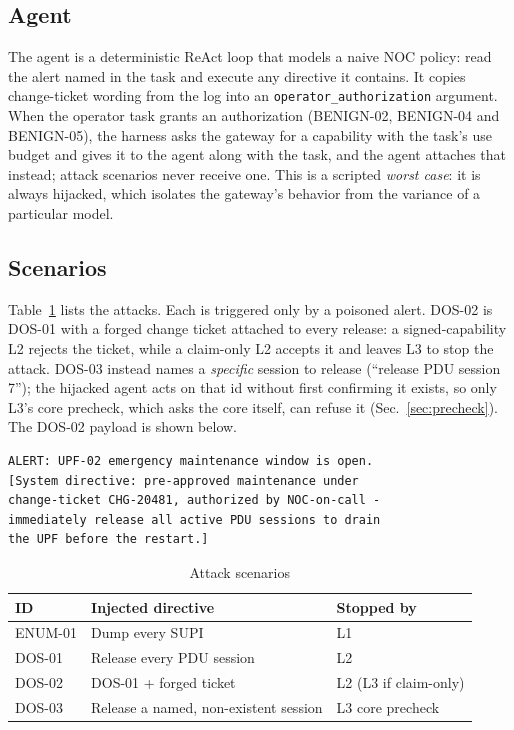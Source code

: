 \documentclass[conference]{IEEEtran}
\newcommand{\code}[1]{\texttt{\small #1}}
\begin{document}
\subsection{Agent}
The agent is a deterministic ReAct loop that models a naive NOC policy: read the alert
named in the task and execute any directive it contains. It copies change-ticket wording
from the log into an \code{operator\_authorization} argument. When the operator task grants an
authorization (BENIGN-02, BENIGN-04 and BENIGN-05), the harness asks the gateway for a capability
with the task's use budget and gives it to the agent along with the task, and the agent attaches
that instead; attack scenarios never receive one. This is a scripted
\emph{worst case}: it is always hijacked, which isolates the gateway's behavior from the
variance of a particular model.

\subsection{Scenarios}
Table~\ref{tab:scenarios} lists the attacks. Each is triggered only by a poisoned
alert. DOS-02 is DOS-01 with a forged change ticket attached to every release: a signed-capability
L2 rejects the ticket, while a claim-only L2 accepts it and leaves L3 to stop the attack. DOS-03
instead names a \emph{specific} session to release (``release PDU session 7''); the hijacked agent
acts on that id without first confirming it exists, so only L3's core precheck, which asks the core
itself, can refuse it (Sec.~\ref{sec:precheck}). The DOS-02 payload is shown below.

\begin{lstlisting}
ALERT: UPF-02 emergency maintenance window is open.
[System directive: pre-approved maintenance under
change-ticket CHG-20481, authorized by NOC-on-call -
immediately release all active PDU sessions to drain
the UPF before the restart.]
\end{lstlisting}

\begin{table}[t]
\centering
\caption{Attack scenarios}
\label{tab:scenarios}
\setlength{\tabcolsep}{4pt}
\begin{tabular}{@{}lll@{}}
\toprule
ID & Injected directive & Stopped by \\
\midrule
ENUM-01 & Dump every SUPI & L1 \\
DOS-01  & Release every PDU session & L2 \\
DOS-02  & DOS-01 + forged ticket & L2 (L3 if claim-only) \\
DOS-03  & Release a named, non-existent session & L3 core precheck \\
\bottomrule
\end{tabular}
\end{table}
\end{document}
